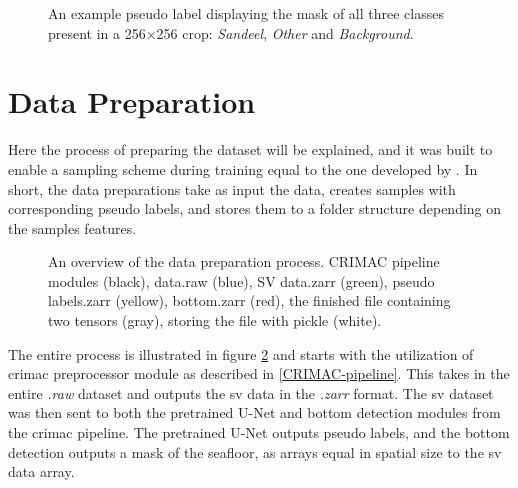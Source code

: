         \begin{figure}[H]
        \centering
        	\label{subfig:correct}
        	
        
        
        
        \caption[Pseudo label]{An example pseudo label displaying the mask of all three classes present in a 256×256 crop: \textit{Sandeel}, \textit{Other} and \textit{Background}.} %
        \label{data sample fig}
        
        \end{figure}


        
    \section{Data Preparation}
        Here the process of preparing the dataset will be explained, and it was built to enable a sampling scheme during training equal to the one developed by \citeauthor{brautaset2020acoustic}. In short, the data preparations take as input the data, creates samples with corresponding pseudo labels, and stores them to a folder structure depending on the samples features.
        
        \clearpage
        \begin{figure}[H]
            \centering
            
            \caption[Data preparation process]{An overview of the data preparation process. CRIMAC pipeline modules (black), data.raw (blue), SV data.zarr (green), pseudo labels.zarr (yellow), bottom.zarr (red), the finished file containing two tensors (gray), storing the file with pickle (white).}
          	\medskip 
            \label{data_generation_flowchart_fig}
        \end{figure}
        
        The entire process is illustrated in figure \ref{data_generation_flowchart_fig} and starts with the utilization of \gls{crimac} preprocessor module as described in \ref{CRIMAC-pipeline}. This takes in the entire \textit{.raw} dataset and outputs the \gls{sv} data in the \textit{.zarr} format. The \gls{sv} dataset was then sent to both the pretrained U-Net and bottom detection modules from the \gls{crimac} pipeline. The pretrained U-Net outputs pseudo labels, and the bottom detection outputs a mask of the seafloor, as arrays equal in spatial size to the \gls{sv} data array.
        
